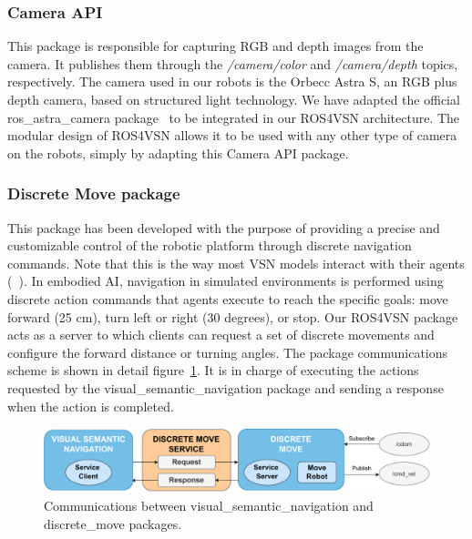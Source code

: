 \subsubsection{Camera API}\label{subsubsec:camera-api}

This package is responsible for capturing RGB and depth images from the camera.
It publishes them through the \textit{/camera/color} and \textit{/camera/depth} topics, respectively.
The camera used in our robots is the Orbecc Astra S, an RGB plus depth camera, based on structured light technology.
We have adapted the official ros\_astra\_camera package~\cite{orbeccros} to be integrated in our ROS4VSN architecture.
The modular design of ROS4VSN allows it to be used with any other type of camera on the robots, simply by adapting this Camera API package.

\subsubsection{Discrete Move package}\label{subsubsec:discrete-move-package}

This package has been developed with the purpose of providing a precise and customizable control of the robotic platform through discrete navigation commands.
Note that this is the way most VSN models interact with their agents (\eg~\cite{ramrakhya2023,chang2020}).
In embodied AI, navigation in simulated environments is performed using discrete action commands that agents execute to reach the specific goals: move forward (25 cm), turn left or right (30 degrees), or stop.
Our ROS4VSN package acts as a server to which clients can request a set of discrete movements and configure the forward distance or turning angles.
The package communications scheme is shown in detail figure~\ref{fig:discrete_move}.
It is in charge of executing the actions requested by the visual\_semantic\_navigation package and sending a response when the action is completed.

\begin{figure}
    \centering
    \includegraphics[width=\linewidth]{figures/ros4vsn/comunicaciones_service}
    \caption{Communications between visual\_semantic\_navigation and discrete\_move packages.}
    \label{fig:discrete_move}
\end{figure}

